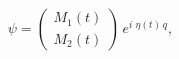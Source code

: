 \begin{equation}
\psi =\left( 
\begin{array}{l}
M_{1}\left( t\right) \\ 
M_{2}\left( t\right)
\end{array}
\right) \,e^{i\,\,\eta \left( t\right) \,q},
\end{equation}

